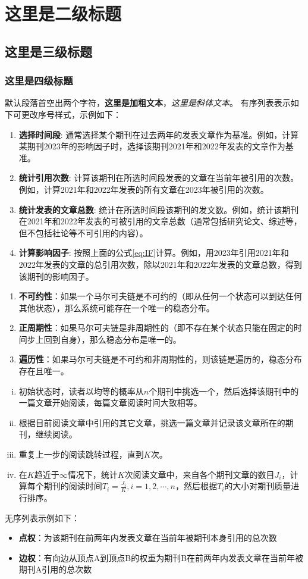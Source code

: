 \section{这里是二级标题}
\subsection{这里是三级标题}
\subsubsection{这里是四级标题}
默认段落首空出两个字符，\textbf{这里是加粗文本}，\textit{这里是斜体文本}。
有序列表表示如下可更改序号样式，示例如下：
\begin{enumerate}[(1)]
    \item \textbf{选择时间段}: 通常选择某个期刊在过去两年的发表文章作为基准。例如，计算某期刊2023年的影响因子时，选择该期刊2021年和2022年发表的文章作为基准。
    \item \textbf{统计引用次数}: 计算该期刊在所选时间段发表的文章在当前年被引用的次数。例如，计算2021年和2022年发表的所有文章在2023年被引用的次数。
    \item \textbf{统计发表的文章总数}: 统计在所选时间段该期刊的发文数。例如，统计该期刊在2021年和2022年发表的可被引用的文章总数（通常包括研究论文、综述等，但不包括社论等不可引用的内容）。
    \item \textbf{计算影响因子}: 按照上面的公式\ref{eq:IF}计算。例如，用2023年引用2021年和2022年发表的文章的总引用次数，除以2021年和2022年发表的文章总数，得到该期刊的影响因子。
\end{enumerate}
\begin{enumerate}
    \item \textbf{不可约性}：如果一个马尔可夫链是不可约的（即从任何一个状态可以到达任何其他状态），那么系统可能存在一个唯一的稳态分布。
    \item \textbf{正周期性}：如果马尔可夫链是非周期性的（即不存在某个状态只能在固定的时间步上回到自身），那么稳态分布是唯一的。
    \item  \textbf{遍历性}：如果马尔可夫链是不可约和非周期性的，则该链是遍历的，稳态分布存在且唯一。
\end{enumerate}
\begin{enumerate}[i)]
    \item 初始状态时，读者以均等的概率从$n$个期刊中挑选一个，然后选择该期刊中的一篇文章开始阅读，每篇文章阅读时间大致相等。
    \item 根据目前阅读文章中引用的其它文章，挑选一篇文章并记录该文章所在的期刊，继续阅读。
    \item 重复上一步的阅读跳转过程，直到$K$次。
    \item 在$K$趋近于$\infty$情况下，统计$K$次阅读文章中，来自各个期刊文章的数目$J_i$，计算每个期刊的阅读时间$T_i=\frac{J_i}{K}, i=1,2,\cdots,n$，然后根据$T_i$的大小对期刊质量进行排序。
\end{enumerate}
无序列表示例如下：
\begin{itemize}
    \item \textbf{点权}：为该期刊在前两年内发表文章在当前年被期刊本身引用的总次数
    \item \textbf{边权}：有向边从顶点A到顶点B的权重为期刊B在前两年内发表文章在当前年被期刊A引用的总次数
\end{itemize}